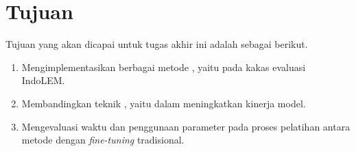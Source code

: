 \section{Tujuan}
\label{sec:tujuan}

Tujuan yang akan dicapai untuk tugas akhir ini adalah sebagai berikut.

\begin{enumerate}
    \item Mengimplementasikan berbagai metode \PEFT, yaitu \methodPEFT pada kakas evaluasi IndoLEM.
    \item Membandingkan teknik \PEFT, yaitu \methodPEFT dalam meningkatkan kinerja model.
    \item Mengevaluasi waktu dan penggunaan parameter pada proses pelatihan antara metode \PEFT dengan \textit{fine-tuning} tradisional.
\end{enumerate}
